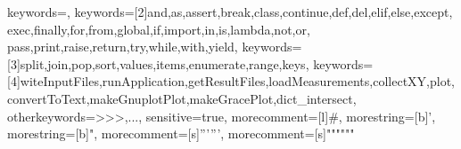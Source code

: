 
%
  {%
   keywords={},%
   keywords=[2]{and,as,assert,break,class,continue,def,del,elif,else,except,%
      exec,finally,for,from,global,if,import,in,is,lambda,not,or,%
      pass,print,raise,return,try,while,with,yield},%
   keywords=[3]{split,join,pop,sort,values,items,enumerate,range,keys},%
   keywords=[4]{witeInputFiles,runApplication,getResultFiles,loadMeasurements,collectXY,plot,convertToText,makeGnuplotPlot,makeGracePlot,dict_intersect},%
   otherkeywords={>>>,...},%
   sensitive=true,%
   morecomment=[l]\#,%
   morestring=[b]',%
   morestring=[b]",%
   morecomment=[s]{'''}{'''},%
   morecomment=[s]{"""}{"""}%
}%
%
%
